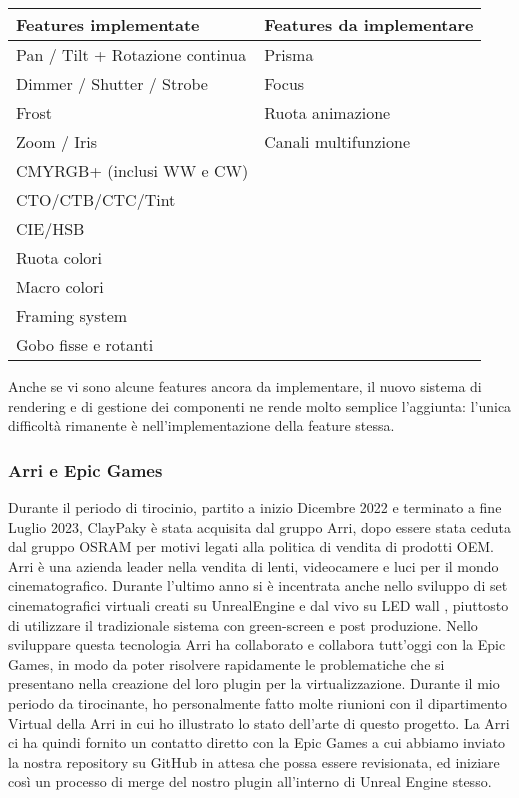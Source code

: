 \documentclass[main.tex]{subfiles}
\begin{document}
\noindent\begin{tabularx}{1\textwidth} { | >{\centering\arraybackslash}X | >{\centering\arraybackslash}X | }
    \hline
        \textbf{Features implementate}	& \textbf{Features da implementare}	\\
    \hline
        Pan / Tilt + Rotazione continua & Prisma							\\
    \hline
        Dimmer / Shutter / Strobe		& Focus								\\
    \hline
        Frost       					& Ruota animazione					\\
    \hline
        Zoom / Iris						& Canali multifunzione				\\
    \hline
        CMYRGB+ (inclusi WW e CW)		&               					\\
    \hline
        CTO/CTB/CTC/Tint				& 									\\
    \hline
        CIE/HSB							& 									\\
    \hline
        Ruota colori					& 									\\
    \hline
        Macro colori					& 									\\
    \hline
        Framing system					& 									\\
    \hline
        Gobo fisse e rotanti			& 									\\
    \hline
\end{tabularx}
\newline

Anche se vi sono alcune features ancora da implementare, il nuovo sistema di rendering e di gestione dei componenti ne rende molto semplice l'aggiunta: l'unica difficoltà rimanente è nell'implementazione della feature stessa.

\subsubsection{Arri e Epic Games}\label{subsec:6_1_Arri-EG}
Durante il periodo di tirocinio, partito a inizio Dicembre 2022 e terminato a fine Luglio 2023, ClayPaky è stata acquisita dal gruppo Arri, dopo essere stata ceduta dal gruppo OSRAM per motivi legati alla politica di vendita di prodotti OEM. Arri è una azienda leader nella vendita di lenti, videocamere e luci per il mondo cinematografico. Durante l'ultimo anno si è incentrata anche nello sviluppo di set cinematografici virtuali creati su UnrealEngine e  dal vivo su LED wall \cite{virtualProduction}, piuttosto di utilizzare il tradizionale sistema con green-screen e post produzione. Nello sviluppare questa tecnologia Arri ha collaborato e collabora tutt'oggi con la Epic Games, in modo da poter risolvere rapidamente le problematiche che si presentano nella creazione del loro plugin per la virtualizzazione. Durante il mio periodo da tirocinante, ho personalmente fatto molte riunioni con il dipartimento Virtual della Arri in cui ho illustrato lo stato dell'arte di questo progetto. La Arri ci ha quindi fornito un contatto diretto con la Epic Games a cui abbiamo inviato la nostra repository su GitHub \cite{gdtfImporterPlugin} in attesa che possa essere revisionata, ed iniziare così un processo di merge del nostro plugin all'interno di Unreal Engine stesso.
\end{document}
